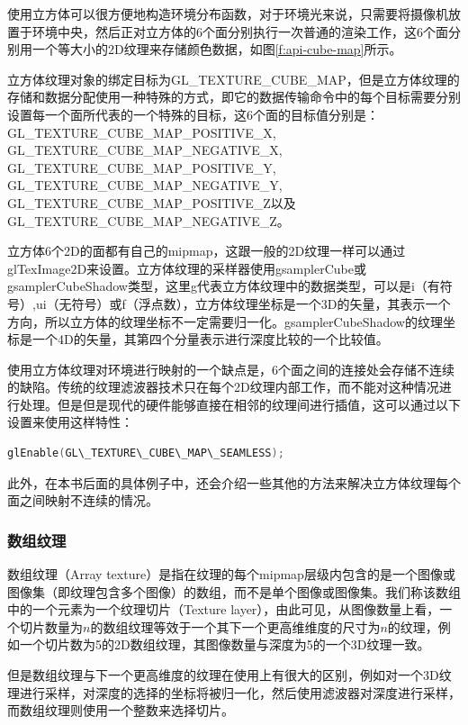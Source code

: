 使用立方体可以很方便地构造环境分布函数，对于环境光来说，只需要将摄像机放置于环境中央，然后正对立方体的6个面分别执行一次普通的渲染工作，这6个面分别用一个等大小的2D纹理来存储颜色数据，如图\ref{f:api-cube-map}所示。

立方体纹理对象的绑定目标为GL\_TEXTURE\_CUBE\_MAP，但是立方体纹理的存储和数据分配使用一种特殊的方式，即它的数据传输命令中的每个目标需要分别设置每一个面所代表的一个特殊的目标，这6个面的目标值分别是：GL\_TEXTURE\_CUBE\_MAP\_POSITIVE\_X, GL\_TEXTURE\_CUBE\_MAP\_NEGATIVE\_X, GL\_TEXTURE\_CUBE\_MAP\_POSITIVE\_Y, GL\_TEXTURE\_CUBE\_MAP\_NEGATIVE\_Y, GL\_TEXTURE\_CUBE\_MAP\_POSITIVE\_Z以及 GL\_TEXTURE\_CUBE\_MAP\_NEGATIVE\_Z。

立方体6个2D的面都有自己的mipmap，这跟一般的2D纹理一样可以通过glTexImage2D来设置。立方体纹理的采样器使用gsamplerCube或gsamplerCubeShadow类型，这里g代表立方体纹理中的数据类型，可以是i（有符号）,ui（无符号）或f（浮点数），立方体纹理坐标是一个3D的矢量，其表示一个方向，所以立方体的纹理坐标不一定需要归一化。gsamplerCubeShadow的纹理坐标是一个4D的矢量，其第四个分量表示进行深度比较的一个比较值。

使用立方体纹理对环境进行映射的一个缺点是，6个面之间的连接处会存储不连续的缺陷。传统的纹理滤波器技术只在每个2D纹理内部工作，而不能对这种情况进行处理。但是但是现代的硬件能够直接在相邻的纹理间进行插值，这可以通过以下设置来使用这样特性：

\begin{lstlisting}[language=C++]
glEnable(GL\_TEXTURE\_CUBE\_MAP\_SEAMLESS)​;
\end{lstlisting}

此外，在本书后面的具体例子中，还会介绍一些其他的方法来解决立方体纹理每个面之间映射不连续的情况。
 




\subsubsection{数组纹理}
数组纹理（Array texture）是指在纹理的每个mipmap层级内包含的是一个图像或图像集（即纹理包含多个图像）的数组，而不是单个图像或图像集。我们称该数组中的一个元素为一个纹理切片（Texture layer），由此可见，从图像数量上看，一个切片数量为$n$的数组纹理等效于一个其下一个更高维维度的尺寸为$n$的纹理，例如一个切片数为5的2D数组纹理，其图像数量与深度为5的一个3D纹理一致。

但是数组纹理与下一个更高维度的纹理在使用上有很大的区别，例如对一个3D纹理进行采样，对深度的选择的坐标将被归一化，然后使用滤波器对深度进行采样，而数组纹理则使用一个整数来选择切片。

